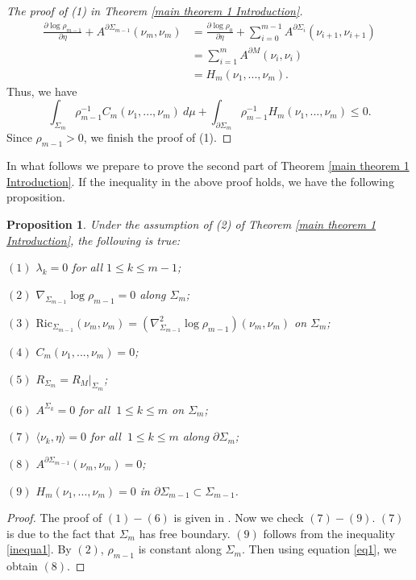 \documentclass[11pt,letterpaper]{amsart}
\newtheorem{proposition}[theorem]{Proposition}
\theoremstyle{definition}
\theoremstyle{remark}
\numberwithin{equation}{section}
\begin{document}
\begin{proof}[The proof of (1) in Theorem \ref{main theorem 1 Introduction}]
\begin{equation}
    \begin{aligned}
        \frac{\partial \log \rho_{m-1}}{\partial \eta}+A^{\partial \Sigma_{m-1}}(\nu_{m},\nu_{m})
        &=
        \frac{\partial \log \rho_{0}}{\partial \eta}+\sum_{i=0}^{m-1}A^{\partial \Sigma_{i}}(\nu_{i+1},\nu_{i+1})\\
        &=\sum_{i=1}^{m}A^{\partial M}(\nu_{i},\nu_{i})\\
        &=H_{m}(\nu_{1},...,\nu_{m}).
    \end{aligned}
    \end{equation}
    Thus, we have
    \begin{equation}\label{inequa1}
    \int_{\Sigma_{m}}\rho_{m-1}^{-1}C_{m}(\nu_{1},...,\nu_{m})\ d\mu + \int_{\partial \Sigma_{m}}\rho_{m-1}^{-1}H_{m}(\nu_{1},...,\nu_{m})\leq 0.
    \end{equation}
    Since $\rho_{m-1}>0$, we finish the proof of (1).
\end{proof}
In what follows we prepare to prove the second part of Theorem \ref{main theorem 1 Introduction}. If the inequality in the above proof holds, we have the following proposition.
\begin{proposition}\label{rigidity}
    Under the assumption of (2) of Theorem \ref{main theorem 1 Introduction}, the following is true:

    $(1)$ $\lambda_{k}=0$ for all $ 1\leq k\leq m-1$;

    $(2)$ $\nabla_{\Sigma_{m-1}}\log\rho_{m-1}=0$ along $\Sigma_{m}$;

    $(3)$ $\text{Ric}_{\Sigma_{m-1}}(\nu_{m},\nu_{m})=(\nabla^{2}_{\Sigma_{m-1}}\log \rho_{m-1})(\nu_{m},\nu_{m})$ on $\Sigma_{m}$;

    $(4)$ $C_{m}(\nu_{1},...,\nu_{m})=0$;

    $(5)$ $R_{\Sigma_{m}}=R_{M}|_{\Sigma_{m}}$;

    $(6)$ $A^{\Sigma_{k}}=0$ for all $\ 1\leq k\leq m$ on $\Sigma_{m}$;

    $(7)$ $\langle \nu_{k},\eta\rangle =0$ for all $\ 1\leq k\leq m$ along $\partial \Sigma_m$;
    
    $(8)$ $A^{\partial \Sigma_{m-1}}(\nu_{m},\nu_{m})=0$;

    $(9)$ $H_{m}(\nu_{1},...,\nu_{m})=0$ in $\partial\Sigma_{m-1}\subset \Sigma_{m-1}$.
\end{proposition}
\begin{proof}
     The proof of $(1)-(6)$ is given in \cite[Proposition 2.1]{ChuKwongLeerigidity}. Now we check $(7)-(9)$. $(7)$ is due to the fact that $\Sigma_{m}$ has free boundary.
   $ (9)$ follows from the inequality \eqref{inequa1}. By $(2)$, $\rho_{m-1}$ is constant along $\Sigma_{m}$. Then using equation \eqref{eq1}, we obtain $(8)$. 
\end{proof}
\end{document}
